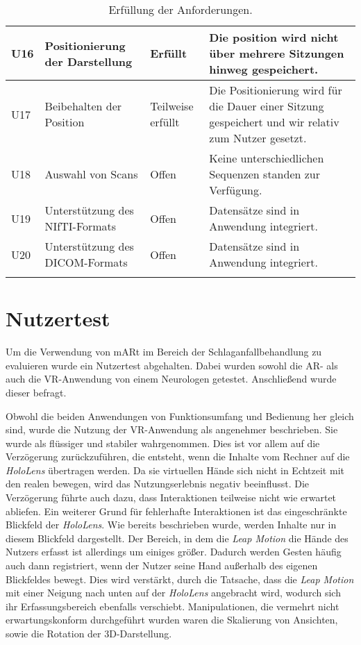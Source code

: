 \begin{longtable} {p{}p{}p{}p{}}
\midrule 
U16 & Positionierung der Darstellung & Erfüllt & Die position wird nicht über mehrere Sitzungen hinweg gespeichert.\\
\midrule 
U17 & Beibehalten der Position & Teilweise erfüllt & Die Positionierung wird für die Dauer einer Sitzung gespeichert und wir relativ zum Nutzer gesetzt.\\
\midrule 
U18 & Auswahl von Scans & Offen & Keine unterschiedlichen Sequenzen standen zur Verfügung.\\
\midrule 
U19 & Unterstützung des NIfTI-Formats & Offen & Datensätze sind in Anwendung integriert.\\
\midrule 
U20 & Unterstützung des DICOM-Formats & Offen & Datensätze sind in Anwendung integriert.\\

\bottomrule
\caption{\label{tab:evaluation}Erfüllung der Anforderungen.}
\end{longtable}

\section{Nutzertest}
\label{nazuertest}

Um die Verwendung von mARt im Bereich der Schlaganfallbehandlung zu evaluieren wurde ein Nutzertest abgehalten. 
Dabei wurden sowohl die AR- als auch die VR-Anwendung von einem Neurologen getestet. Anschließend wurde dieser befragt.

Obwohl die beiden Anwendungen von Funktionsumfang und Bedienung her gleich sind, wurde die Nutzung der VR-Anwendung als angenehmer beschrieben. 
Sie wurde als flüssiger und stabiler wahrgenommen. 
Dies ist vor allem auf die Verzögerung zurückzuführen, die entsteht, wenn die Inhalte vom Rechner auf die \textit{HoloLens} übertragen werden. Da sie virtuellen Hände sich nicht in Echtzeit mit den realen bewegen, wird das Nutzungserlebnis negativ beeinflusst. 
Die Verzögerung führte auch dazu, dass Interaktionen teilweise nicht wie erwartet abliefen. 
Ein weiterer Grund für fehlerhafte Interaktionen ist das eingeschränkte Blickfeld der \textit{HoloLens}. Wie bereits beschrieben wurde, werden Inhalte nur in diesem Blickfeld dargestellt. Der Bereich, in dem die \textit{Leap Motion} die Hände des Nutzers erfasst ist allerdings um einiges größer. Dadurch werden Gesten häufig auch dann registriert, wenn der Nutzer seine Hand außerhalb des eigenen Blickfeldes bewegt. Dies wird verstärkt, durch die Tatsache, dass die \textit{Leap Motion} mit einer Neigung nach unten auf der \textit{HoloLens} angebracht wird, wodurch sich ihr Erfassungsbereich ebenfalls verschiebt.
Manipulationen, die vermehrt nicht erwartungskonform durchgeführt wurden waren die Skalierung von Ansichten, sowie die Rotation der 3D-Darstellung.

